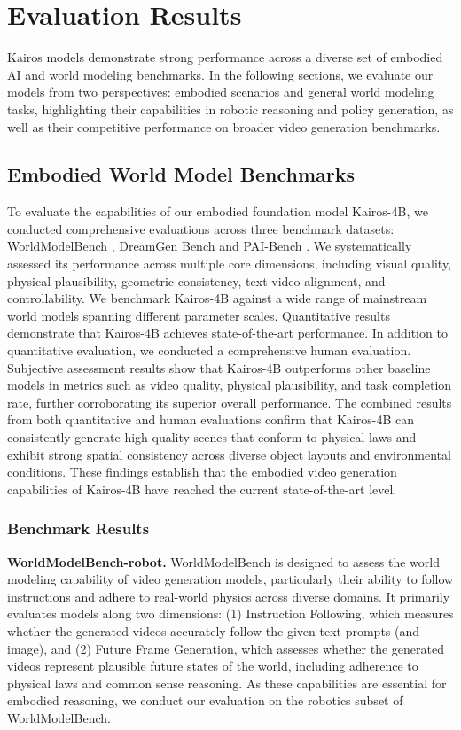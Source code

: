 


\section{Evaluation Results}
Kairos models demonstrate strong performance across a diverse set of embodied AI and world modeling benchmarks. In the following sections, we evaluate our models from two perspectives: embodied scenarios and general world modeling tasks, highlighting their capabilities in robotic reasoning and policy generation, as well as their competitive performance on broader video generation benchmarks.

\subsection{Embodied World Model Benchmarks}
To evaluate the capabilities of our embodied foundation model Kairos-4B, we conducted comprehensive evaluations across three benchmark datasets: WorldModelBench \cite{li2025worldmodelbench}, DreamGen Bench \cite{fan2025dreamgen} and PAI-Bench \cite{zhou2025pai}. We systematically assessed its performance across multiple core dimensions, including visual quality, physical plausibility, geometric consistency, text-video alignment, and controllability. We benchmark Kairos-4B against a wide range of mainstream world models spanning different parameter scales. Quantitative results demonstrate that Kairos-4B achieves state-of-the-art performance.
In addition to quantitative evaluation, we conducted a comprehensive human evaluation. Subjective assessment results show that Kairos-4B outperforms other baseline models in metrics such as video quality, physical plausibility, and task completion rate, further corroborating its superior overall performance.
The combined results from both quantitative and human evaluations confirm that Kairos-4B can consistently generate high-quality scenes that conform to physical laws and exhibit strong spatial consistency across diverse object layouts and environmental conditions. These findings establish that the embodied video generation capabilities of Kairos-4B have reached the current state-of-the-art level.


\subsubsection{Benchmark Results}

\textbf{WorldModelBench-robot.}  
WorldModelBench \cite{li2025worldmodelbench} is designed to assess the world modeling capability of video generation models, particularly their ability to follow instructions and adhere to real-world physics across diverse domains. It primarily evaluates models along two dimensions: (1) Instruction Following, which measures whether the generated videos accurately follow the given text prompts (and image), and (2) Future Frame Generation, which assesses whether the generated videos represent plausible future states of the world, including adherence to physical laws and common sense reasoning. As these capabilities are essential for embodied reasoning, we conduct our evaluation on the robotics subset of WorldModelBench.

